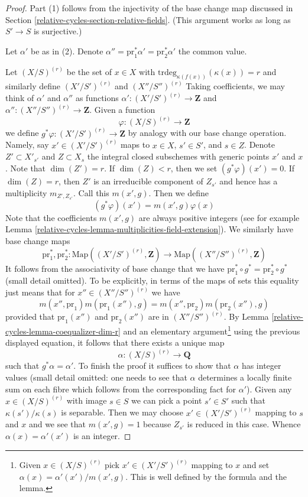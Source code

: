 \begin{proof}
Part (1) follows from the injectivity of the base change map discussed
in Section \ref{relative-cycles-section-relative-fields}. (This argument works as
long as $S' \to S$ is surjective.)

\medskip\noindent
Let $\alpha'$ be as in (2). Denote
$\alpha'' = \text{pr}_1^*\alpha' = \text{pr}_2^*\alpha'$
the common value.

\medskip\noindent
Let $(X/S)^{(r)}$ be the set of $x \in X$ with
$\text{trdeg}_{\kappa(f(x))}(\kappa(x)) = r$
and similarly define $(X'/S')^{(r)}$ and $(X''/S'')^{(r)}$
Taking coefficients, we may think of $\alpha'$ and $\alpha''$ as functions
$\alpha' : (X'/S')^{(r)} \to \mathbf{Z}$ and
$\alpha'' : (X''/S'')^{(r)} \to \mathbf{Z}$.
Given a function
$$
\varphi : (X/S)^{(r)} \to \mathbf{Z}
$$
we define $g^*\varphi : (X'/S')^{(r)} \to \mathbf{Z}$ by analogy
with our base change operation. Namely, say $x' \in (X'/S')^{(r)}$
maps to $x \in X$, $s' \in S'$, and $s \in Z$.
Denote $Z' \subset X'_{s'}$ and $Z \subset X_s$ the integral
closed subschemes with generic points $x'$ and $x$. Note
that $\dim(Z') = r$. If $\dim(Z) < r$, then we set $(g^*\varphi)(x') = 0$.
If $\dim(Z) = r$, then $Z'$ is an irreducible component of $Z_{s'}$ and
hence has a multiplicity $m_{Z', Z_{s'}}$. Call this $m(x', g)$.
Then we define
$$
(g^*\varphi)(x') = m(x', g) \varphi(x)
$$
Note that the coefficients $m(x', g)$ are always positive integers
(see for example Lemma \ref{relative-cycles-lemma-multiplicities-field-extension}).
We similarly have base change maps
$$
\text{pr}_1^*, \text{pr}_2^* :
\text{Map}((X'/S')^{(r)}, \mathbf{Z})
\longrightarrow
\text{Map}((X''/S'')^{(r)}, \mathbf{Z})
$$
It follows from the associativity of base change that we have
$\text{pr}_1^* \circ g^* = \text{pr}_2^* \circ g^*$ (small detail
omitted). To be explicitly, in terms of the maps of sets this
equality just means that for $x'' \in (X''/S'')^{(r)}$ we have
$$
m(x'', \text{pr}_1) m(\text{pr}_1(x''), g) =
m(x'', \text{pr}_2) m(\text{pr}_2(x''), g)
$$
provided that $\text{pr}_1(x'')$ and $\text{pr}_2(x'')$ are
in $(X''/S'')^{(r)}$.
By Lemma \ref{relative-cycles-lemma-coequalizer-dim-r} and an elementary
argument\footnote{Given $x \in (X/S)^{(r)}$ pick $x' \in (X'/S')^{(r)}$
mapping to $x$ and set $\alpha(x) = \alpha'(x')/m(x', g)$. This
is well defined by the formula and the lemma.}
using the previous displayed equation,
it follows that there exists a unique map
$$
\alpha : (X/S)^{(r)} \to \mathbf{Q}
$$
such that $g^*\alpha = \alpha'$. To finish the proof it suffices
to show that $\alpha$ has integer values (small detail omitted: one
needs to see that $\alpha$ determines a locally finite sum on
each fibre which follows from the corresponding fact for $\alpha'$).
Given any $x \in (X/S)^{(r)}$ with image $s \in S$
we can pick a point $s' \in S'$ such that $\kappa(s')/\kappa(s)$
is separable. Then we may choose $x' \in (X'/S')^{(r)}$ mapping
to $s$ and $x$ and we see that $m(x', g) = 1$ because
$Z_{s'}$ is reduced in this case. Whence $\alpha(x) = \alpha'(x')$
is an integer.
\end{proof}


